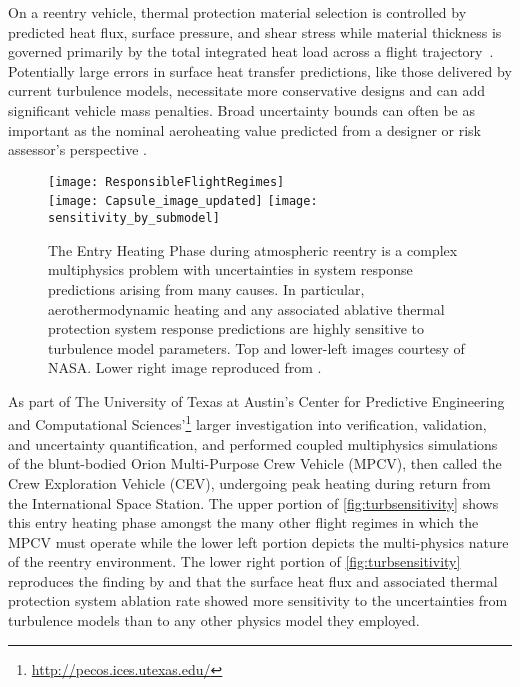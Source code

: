 On a reentry vehicle, thermal protection material selection is controlled by
predicted heat flux, surface pressure, and shear stress while material thickness
is governed primarily by the total integrated heat load across a flight
trajectory~\citep{Wright2007Probabilistic}.  Potentially large errors in surface
heat transfer predictions, like those delivered by current turbulence models,
necessitate more conservative designs and can add significant vehicle mass
penalties.  Broad uncertainty bounds can often be as important as the nominal
aeroheating value predicted from a designer or risk assessor's perspective
\citep{Palmer2007Uncertainty}.

\begin{figure}
\centering
\texttt{[image: ResponsibleFlightRegimes]}
\\
\vspace{1em}
\texttt{[image: Capsule\_image\_updated]}
\hfill
\texttt{[image: sensitivity\_by\_submodel]}
\\
\caption[Physics relevant to atmospheric reentry]{%
  The Entry Heating Phase during atmospheric reentry is a complex multiphysics
  problem with uncertainties in system response predictions arising from many
  causes.  In particular, aerothermodynamic heating and any associated ablative
  thermal protection system response predictions are highly sensitive to
  turbulence model parameters.  Top and lower-left images courtesy of NASA\@.
  Lower right image reproduced
  from \citet{Stogner2011Uncertainty}.\label{fig:turbsensitivity}
}
\end{figure}

As part of The University of Texas at Austin's Center for Predictive Engineering
and Computational Sciences'\footnote{\url{http://pecos.ices.utexas.edu/}}
larger investigation into verification, validation, and uncertainty
quantification, \citet{Bauman2011Loose} and \citet{Stogner2011Uncertainty}
performed coupled multiphysics simulations of the blunt-bodied Orion
Multi-Purpose Crew Vehicle (MPCV), then called the Crew Exploration Vehicle
(CEV), undergoing peak heating during return from the International Space
Station.  The upper portion of \autoref{fig:turbsensitivity} shows this
entry heating phase amongst the many other flight regimes in which the
MPCV must operate while the lower left portion depicts the multi-physics
nature of the reentry environment.  The lower right portion of \autoref{fig:turbsensitivity}
reproduces the finding by \citeauthor{Bauman2011Loose} and \citeauthor{Stogner2011Uncertainty} that the
surface heat flux and associated thermal protection system ablation rate showed
more sensitivity to the uncertainties from turbulence models than to any other physics
model they employed.


